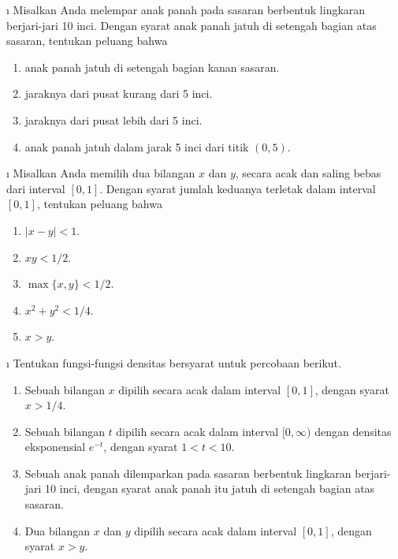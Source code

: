 \begin{LJSItem}
\i\label{exer 4.2.4} Misalkan Anda melempar anak panah pada sasaran berbentuk lingkaran berjari-jari 10 inci.  Dengan syarat
anak panah jatuh di setengah bagian atas sasaran, tentukan peluang bahwa
\begin{enumerate}
\item anak panah jatuh di setengah bagian kanan sasaran.

\item jaraknya dari pusat kurang dari 5 inci.

\item jaraknya dari pusat lebih dari 5 inci.

\item anak panah jatuh dalam jarak 5 inci dari titik $(0,5)$.
\end{enumerate}

\i\label{exer 4.2.5} Misalkan Anda memilih dua bilangan $x$ dan $y$, secara acak dan saling bebas dari
interval $[0,1]$.  Dengan syarat jumlah keduanya terletak dalam interval $[0,1]$,
tentukan peluang bahwa
\begin{enumerate}
\item $|x - y| < 1$.

\item $xy < 1/2$.

\item $\max\{x,y\} < 1/2$.

\item $x^2 + y^2 < 1/4$.

\item $x > y$.
\end{enumerate}

\i\label{exer 4.2.6} Tentukan fungsi-fungsi densitas bersyarat untuk percobaan berikut.
\begin{enumerate}
\item Sebuah bilangan $x$ dipilih secara acak dalam interval $[0,1]$, dengan syarat
$x > 1/4$.

\item Sebuah bilangan $t$ dipilih secara acak dalam interval $[0,\infty)$ dengan
densitas eksponensial $e^{-t}$, dengan syarat $1 < t < 10$.

\item Sebuah anak panah dilemparkan pada sasaran berbentuk lingkaran berjari-jari 10 inci, dengan syarat
anak panah itu jatuh di setengah bagian atas sasaran.

\item Dua bilangan $x$ dan $y$ dipilih secara acak dalam interval
$[0,1]$, dengan syarat $x > y$.
\end{enumerate}


\end{LJSItem}
